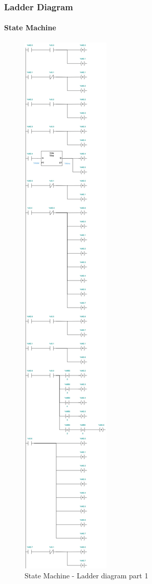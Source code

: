 \documentclass[12pt]{beamer}
\begin{document}
\begin{frame}
\frametitle{Ladder Diagram}
\framesubtitle{State Machine}
\begin{figure}
    \centering
    \includegraphics[trim={0 98cm 0 0}, clip, scale=.5]{img/Ladder_diagram_2.jpg}
    \caption{State Machine - Ladder diagram part 1}
    \label{fig:ladder21}
\end{figure}
\end{frame}
\end{document}
